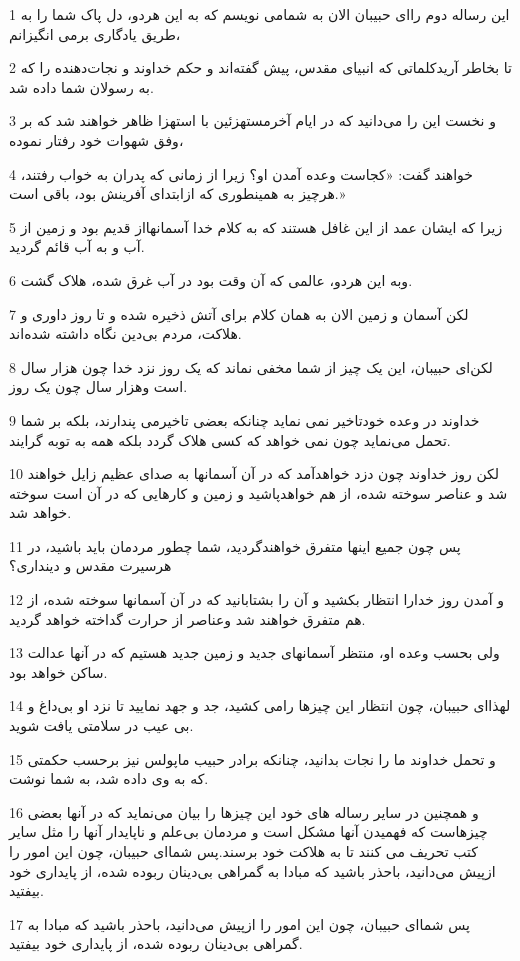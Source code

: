 \par 1 این رساله دوم را‌ای حبیبان الان به شمامی نویسم که به این هردو، دل پاک شما را به طریق یادگاری برمی انگیزانم،
\par 2 تا بخاطر آریدکلماتی که انبیای مقدس، پیش گفته‌اند و حکم خداوند و نجات‌دهنده را که به رسولان شما داده شد.
\par 3 و نخست این را می‌دانید که در ایام آخرمستهزئین با استهزا ظاهر خواهند شد که بر وفق شهوات خود رفتار نموده،
\par 4 خواهند گفت: «کجاست وعده آمدن او؟ زیرا از زمانی که پدران به خواب رفتند، هرچیز به همینطوری که ازابتدای آفرینش بود، باقی است.»
\par 5 زیرا که ایشان عمد از این غافل هستند که به کلام خدا آسمانهااز قدیم بود و زمین از آب و به آب قائم گردید.
\par 6 وبه این هردو، عالمی که آن وقت بود در آب غرق شده، هلاک گشت.
\par 7 لکن آسمان و زمین الان به همان کلام برای آتش ذخیره شده و تا روز داوری و هلاکت، مردم بی‌دین نگاه داشته شده‌اند.
\par 8 لکن‌ای حبیبان، این یک چیز از شما مخفی نماند که یک روز نزد خدا چون هزار سال است وهزار سال چون یک روز.
\par 9 خداوند در وعده خودتاخیر نمی نماید چنانکه بعضی تاخیرمی پندارند، بلکه بر شما تحمل می‌نماید چون نمی خواهد که کسی هلاک گردد بلکه همه به توبه گرایند.
\par 10 لکن روز خداوند چون دزد خواهدآمد که در آن آسمانها به صدای عظیم زایل خواهند شد و عناصر سوخته شده، از هم خواهدپاشید و زمین و کارهایی که در آن است سوخته خواهد شد.
\par 11 پس چون جمیع اینها متفرق خواهندگردید، شما چطور مردمان باید باشید، در هرسیرت مقدس و دینداری؟
\par 12 و آمدن روز خدارا انتظار بکشید و آن را بشتابانید که در آن آسمانها سوخته شده، از هم متفرق خواهند شد وعناصر از حرارت گداخته خواهد گردید.
\par 13 ولی بحسب وعده او، منتظر آسمانهای جدید و زمین جدید هستیم که در آنها عدالت ساکن خواهد بود.
\par 14 لهذا‌ای حبیبان، چون انتظار این چیزها رامی کشید، جد و جهد نمایید تا نزد او بی‌داغ و بی عیب در سلامتی یافت شوید.
\par 15 و تحمل خداوند ما را نجات بدانید، چنانکه برادر حبیب ماپولس نیز برحسب حکمتی که به وی داده شد، به شما نوشت.
\par 16 و همچنین در سایر رساله های خود این چیزها را بیان می‌نماید که در آنها بعضی چیزهاست که فهمیدن آنها مشکل است و مردمان بی‌علم و ناپایدار آنها را مثل سایر کتب تحریف می کنند تا به هلاکت خود برسند.پس شما‌ای حبیبان، چون این امور را ازپیش می‌دانید، باحذر باشید که مبادا به گمراهی بی‌دینان ربوده شده، از پایداری خود بیفتید.
\par 17 پس شما‌ای حبیبان، چون این امور را ازپیش می‌دانید، باحذر باشید که مبادا به گمراهی بی‌دینان ربوده شده، از پایداری خود بیفتید.



